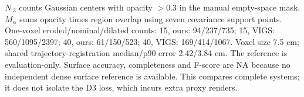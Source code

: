 \begin{table}[tbp]
\centering
\caption{Independent manual free-space diagnostics on Aria1253 at 15 and 40 training renders/KF. Held-out RGB quality is reported alongside opacity in the annotated empty space.}
\label{tab:geometry}
\begingroup
\footnotesize
\setlength{\tabcolsep}{2.8pt}
\renewcommand{\arraystretch}{1.02}
\endgroup
\par\vspace{3pt}
\begin{minipage}{\linewidth}
\scriptsize\raggedright $N_{.3}$ counts Gaussian centers with opacity $>0.3$ in the manual empty-space mask. $M_\alpha$ sums opacity times region overlap using seven covariance support points. One-voxel eroded/nominal/dilated counts: 15, ours: 94/237/735; 15, VIGS: 560/1095/2397; 40, ours: 61/150/523; 40, VIGS: 169/414/1067. Voxel size 7.5 cm; shared trajectory-registration median/p90 error 2.42/3.84 cm. The reference is evaluation-only. Surface accuracy, completeness and F-score are NA because no independent dense surface reference is available. This compares complete systems; it does not isolate the D3 loss, which incurs extra proxy renders.
\end{minipage}
\end{table}
